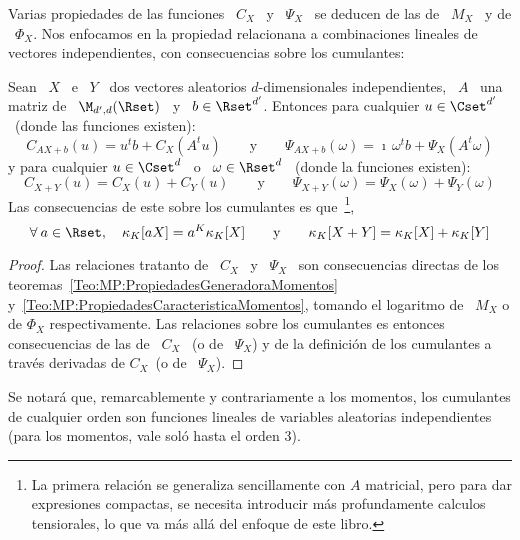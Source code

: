 {Varias propiedades de las  funciones \ $C_X$ \ y \ $\Psi_X$  \ se deducen de las
de  \ $M_X$  \ y  de \  $\Phi_X$. Nos  enfocamos en  la propiedad  relacionana a
combinaciones lineales  de vectores independientes, con  consecuencias sobre los
cumulantes:
%
\begin{teorema}%
\label{Teo:MP:PropiedadesGeneradoraCumulantes}
%
  Sean  \   $X$  \  e  \   $Y$  \  dos   vectores  aleatorios  $d$-dimensionales
  independientes,  \ $A$  \ una  matriz de  \ $\M_{d',d}(\Rset)$  \ y  \  $b \in
  \Rset^{d'}$.   Entonces  para  cualquier  $u  \in  \Cset^{d'}$  \  (donde  las
  funciones existen):
  \[
  C_{A  X +  b}(u) =  u^t b  + C_X\left(  A^t u  \right) \qquad  \mbox{y} \qquad
  \Psi_{A  X +  b}(\omega) =  \imath  \, \omega^t  b +  \Psi_X\left( A^t  \omega
  \right)
  \]
  y  para cualquier  $u \in  \Cset^d$ \  o \  $\omega \in  \Rset^d$ \  (donde la
  funciones existen):
  \[
  C_{X+Y}(u)  = C_X(u)  +  C_Y(u) \qquad  \mbox{y}  \qquad \Psi_{X+Y}(\omega)  =
  \Psi_X(\omega) + \Psi_Y(\omega)
  \]
  Las  consecuencias de este  sobre los  cumulantes es  que~\footnote{La primera
    relaci\'on  se generaliza  sencillamente con  $A$ matricial,  pero  para dar
    expresiones compactas,  se necesita introducir  m\'as profundamente calculos
    tensiorales, lo  que va  m\'as all\'a del  enfoque de este  libro.},
  \[
  \forall \: a \in \Rset, \quad \kappa_K[a X] = a^K \kappa_K[X] \qquad \mbox{y}
  \qquad \kappa_K[X+Y] = \kappa_K[X] + \kappa_K[Y]
  \]
\end{teorema}
%
\begin{proof}
  Las relaciones tratanto de \ $C_X$ \ y \ $\Psi_X$ \ son consecuencias directas
  de           los           teoremas~\ref{Teo:MP:PropiedadesGeneradoraMomentos}
  y~\ref{Teo:MP:PropiedadesCaracteristicaMomentos},  tomando el  logaritmo  de \
  $M_X$ o  de $\Phi_X$ respectivamente.  Las relaciones sobre los  cumulantes es
  entonces  consecuencias de  las  de  \ $C_X$  \  (o de  \  $\Psi_X$)  y de  la
  definici\'on  de  los  cumulantes a  trav\'es  derivadas  de  $C_X$\ (o  de  \
  $\Psi_X$).
\end{proof}
%
Se notar\'a que, remarcablemente y contrariamente a los momentos, los cumulantes
de cualquier orden son funciones lineales de variables aleatorias independientes
(para los momentos, vale sol\'o hasta el orden $3$).  }